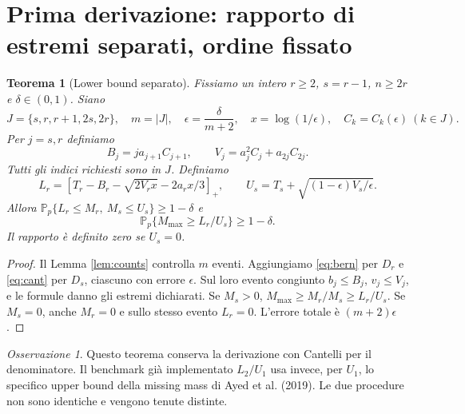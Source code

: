 \documentclass[11pt,a4paper]{article}
\newtheorem{theorem}[proposition]{Teorema}
\theoremstyle{remark}\newtheorem{remark}[proposition]{Osservazione}
\newcommand{\Pp}{\mathbb P_p}
\newcommand{\Mmax}{M_{\max}}
\begin{document}
\section{Prima derivazione: rapporto di estremi separati, ordine fissato}
\begin{theorem}[Lower bound separato]\label{thm:separate}
Fissiamo un intero $r\ge2$, $s=r-1$, $n\ge2r$ e $\delta\in(0,1)$.
Siano
\[
 J=\{s,r,r+1,2s,2r\},\quad m=|J|,\quad
 \epsilon=\frac{\delta}{m+2},\quad x=\log(1/\epsilon),\quad
 C_k=C_k(\epsilon)\ (k\in J).
\]
Per $j=s,r$ definiamo
\[
 B_j=j a_{j+1}C_{j+1},\qquad V_j=a_j^2C_j+a_{2j}C_{2j}.
\]
Tutti gli indici richiesti sono in $J$. Definiamo
\[
 L_r=[T_r-B_r-\sqrt{2V_rx}-2a_rx/3]_+,\qquad
 U_s=T_s+\sqrt{(1-\epsilon)V_s/\epsilon}.
\]
Allora $\Pp\{L_r\le M_r,\ M_s\le U_s\}\ge1-\delta$ e
\[
 \Pp\{\Mmax\ge L_r/U_s\}\ge1-\delta.
\]
Il rapporto è definito zero se $U_s=0$.
\end{theorem}
\begin{proof}
Il Lemma \ref{lem:counts} controlla $m$ eventi. Aggiungiamo
\eqref{eq:bern} per $D_r$ e \eqref{eq:cant} per $D_s$, ciascuno con
errore $\epsilon$. Sul loro evento congiunto $b_j\le B_j$, $v_j\le V_j$,
e le formule danno gli estremi dichiarati. Se $M_s>0$,
$\Mmax\ge M_r/M_s\ge L_r/U_s$. Se $M_s=0$, anche $M_r=0$
e sullo stesso evento $L_r=0$. L'errore totale è $(m+2)\epsilon$.
\end{proof}
\begin{remark}
Questo teorema conserva la derivazione con Cantelli per il denominatore.
Il benchmark già implementato $L_2/U_1$ usa invece, per $U_1$, lo
specifico upper bound della missing mass di Ayed et al. (2019).
Le due procedure non sono identiche e vengono tenute distinte.
\end{remark}
\end{document}
